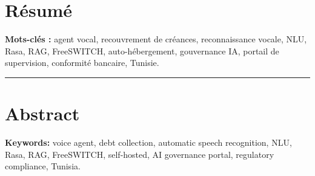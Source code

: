 \chapter*{R\'esum\'e}


\vspace{0.5cm}
\noindent\textbf{Mots-cl\'es :} agent vocal, recouvrement de cr\'eances,
reconnaissance vocale, NLU, Rasa, RAG, FreeSWITCH, auto-h\'ebergement,
gouvernance IA, portail de supervision, conformit\'e bancaire, Tunisie.

\vspace{1cm}
\hrule
\vspace{1cm}

\chapter*{Abstract}


\vspace{0.5cm}
\noindent\textbf{Keywords:} voice agent, debt collection, automatic speech
recognition, NLU, Rasa, RAG, FreeSWITCH, self-hosted, AI governance portal,
regulatory compliance, Tunisia.
